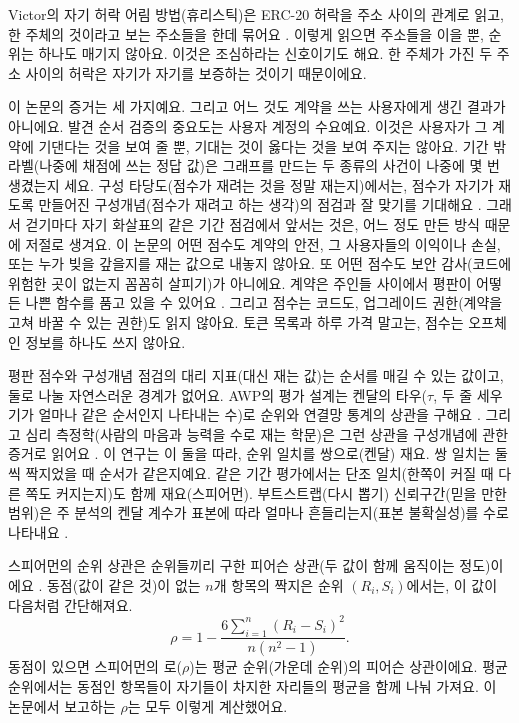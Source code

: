 Victor의 자기 허락 어림 방법(휴리스틱)은 ERC-20 허락을 주소 사이의 관계로 읽고, 한 주체의 것이라고 보는 주소들을 한데 묶어요 \parencite{victor2020clustering}. 이렇게 읽으면 주소들을 이을 뿐, 순위는 하나도 매기지 않아요. 이것은 조심하라는 신호이기도 해요. 한 주체가 가진 두 주소 사이의 허락은 자기가 자기를 보증하는 것이기 때문이에요.


이 논문의 증거는 세 가지예요. 그리고 어느 것도 계약을 쓰는 사용자에게 생긴 결과가 아니에요. 발견 순서 검증의 중요도는 사용자 계정의 수요예요. 이것은 사용자가 그 계약에 기댄다는 것을 보여 줄 뿐, 기대는 것이 옳다는 것을 보여 주지는 않아요. 기간 밖 라벨(나중에 채점에 쓰는 정답 값)은 그래프를 만드는 두 종류의 사건이 나중에 몇 번 생겼는지 세요. 구성 타당도(점수가 재려는 것을 정말 재는지)에서는, 점수가 자기가 재도록 만들어진 구성개념(점수가 재려고 하는 생각)의 점검과 잘 맞기를 기대해요 \parencite{cronbach1955construct}. 그래서 걷기마다 자기 화살표의 같은 기간 점검에서 앞서는 것은, 어느 정도 만든 방식 때문에 저절로 생겨요. 이 논문의 어떤 점수도 계약의 안전, 그 사용자들의 이익이나 손실, 또는 누가 빚을 갚을지를 재는 값으로 내놓지 않아요. 또 어떤 점수도 보안 감사(코드에 위험한 곳이 없는지 꼼꼼히 살피기)가 아니에요. 계약은 주인들 사이에서 평판이 어떻든 나쁜 함수를 품고 있을 수 있어요 \parencite{lin2024crpwarner}. 그리고 점수는 코드도, 업그레이드 권한(계약을 고쳐 바꿀 수 있는 권한)도 읽지 않아요. 토큰 목록과 하루 가격 말고는, 점수는 오프체인 정보를 하나도 쓰지 않아요.


평판 점수와 구성개념 점검의 대리 지표(대신 재는 값)는 순서를 매길 수 있는 값이고, 둘로 나눌 자연스러운 경계가 없어요. AWP의 평가 설계는 켄달의 타우($\tau$, 두 줄 세우기가 얼마나 같은 순서인지 나타내는 수)로 순위와 연결망 통계의 상관을 구해요 \parencite{do2023awp}. 그리고 심리 측정학(사람의 마음과 능력을 수로 재는 학문)은 그런 상관을 구성개념에 관한 증거로 읽어요 \parencite{cronbach1955construct}. 이 연구는 이 둘을 따라, 순위 일치를 쌍으로(켄달) 재요. 쌍 일치는 둘씩 짝지었을 때 순서가 같은지예요. 같은 기간 평가에서는 단조 일치(한쪽이 커질 때 다른 쪽도 커지는지)도 함께 재요(스피어먼). 부트스트랩(다시 뽑기) 신뢰구간(믿을 만한 범위)은 주 분석의 켄달 계수가 표본에 따라 얼마나 흔들리는지(표본 불확실성)를 수로 나타내요 \parencite{efron1979bootstrap}.

스피어먼의 순위 상관은 순위들끼리 구한 피어슨 상관(두 값이 함께 움직이는 정도)이에요 \parencite{spearman1904proof}. 동점(값이 같은 것)이 없는 $n$개 항목의 짝지은 순위 $(R_i,S_i)$에서는, 이 값이 다음처럼 간단해져요.
\begin{equation}
\rho = 1 - \frac{6\sum_{i=1}^n (R_i-S_i)^2}{n(n^2-1)}.
\label{eq:spearman}
\end{equation}
동점이 있으면 스피어먼의 로($\rho$)는 평균 순위(가운데 순위)의 피어슨 상관이에요. 평균 순위에서는 동점인 항목들이 자기들이 차지한 자리들의 평균을 함께 나눠 가져요. 이 논문에서 보고하는 $\rho$는 모두 이렇게 계산했어요.


